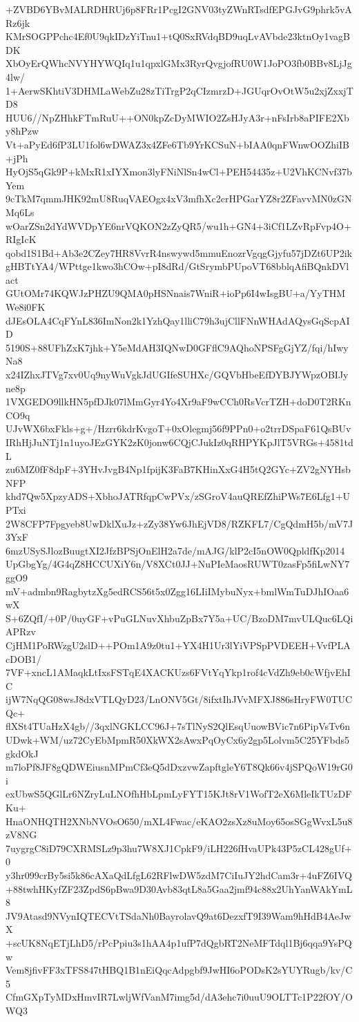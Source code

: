 +ZVBD6YBvMALRDHRUj6p8FRr1PcgI2GNV03tyZWnRTsdfEPGJvG9phrk5vARz6jk
KMrSOGPPchc4Ef0U9qkIDzYiTnu1+tQ0SxRVdqBD9uqLvAVbde23ktnOy1vagBDK
XbOyErQWhcNVYHYWQIq1u1qpxlGMx3RyrQvgjofRU0W1JoPO3fb0BBv8LjJg4lw/
1+AerwSKhtiV3DHMLaWebZu28zTiTrgP2qCIzmrzD+JGUqrOvOtW5u2xjZxxjTD8
HUU6//NpZHhkFTmRuU++ON0kpZcDyMWIO2ZsHJyA3r+nFsIrb8aPIFE2Xby8hPzw
Vt+aPyEd6fP3LU1fol6wDWAZ3x4ZFe6Tb9YrKCSuN+bIAA0qnFWnwOOZhiIB+jPh
HyOjS5qGk9P+kMxR1xIYXmon3lyFNiNlSn4wCl+PEH54435z+U2VhKCNvf37bYem
9cTkM7qmmJHK92mU8RuqVAEOgx4xV3mfhXc2crHPGarYZ8r2ZFavvMN0zGNMq6Ls
wOarZSn2dYdWVDpYE6nrVQKON2zZyQR5/wu1h+GN4+3iCf1LZvRpFvp4O+RIgIcK
qobd1S1Bd+Ab3e2CZey7HR8VvrR4nswywd5mmuEnozrVgqgGjyfu57jDZt6UP2ik
gHBTtYA4/WPttge1kwo3hCOw+pI8dRd/GtSrymbPUpoVT68bblqAfiBQnkDVlact
GUtOMr74KQWJzPHZU9QMA0pHSNnais7WniR+ioPp6I4wIsgBU+a/YyTHMWe8i0FK
dJEsOLA4CqFYnL836ImNon2k1YzhQay1lliC79h3ujCllFNnWHAdAQysGqScpAID
5190S+88UFhZxK7jhk+Y5eMdAH3IQNwD0GFflC9AQhoNPSFgGjYZ/fqi/hIwyNa8
x24IZhxJTVg7xv0Uq9nyWuVgkJdUGIfeSUHXc/GQVbHbeEfDYBJYWpzOBIJyne8p
1VXGEDO9llkHN5pfDJk07lMmGyr4Yo4Xr9aF9wCCh0RsVcrTZH+doD0T2RKnCO9q
UJvWX6bxFkls+g+/Hzrr6kdrKvgoT+0xOlegmj56f9PPn0+o2trrDSpaF61QsBUv
IRhHjJuNTj1n1uyoJEzGYK2zK0jonw6CQjCJukIz0qRHPYKpJlT5VRGs+4581tdL
zu6MZ0fF8dpF+3YHvJvgB4Np1fpijK3FaB7KHinXxG4H5tQ2GYc+ZV2gNYHsbNFP
khd7Qw5XpzyADS+XbhoJATRfqpCwPVx/zSGroV4auQREfZhiPWs7E6Lfg1+UPTxi
2W8CFP7Fpgyeb8UwDklXuJz+zZy38Yw6JhEjVD8/RZKFL7/CgQdmH5b/mV7J3YxF
6mzUSySJlozBuugtXI2JfzBPSjOnElH2a7de/mAJG/klP2cI5nOW0QpldfKp2014
UpGbgYg/4G4qZ8HCCUXiY6n/V8XCt0JJ+NuPIeMaosRUWT0zasFp5fiLwNY7ggO9
mV+admbn9RagbytzXg5edRCS56t5x0Zgg16LIiIMybuNyx+bmlWmTuDJhIOaa6wX
S+6ZQfI/+0P/0uyGF+vPuGLNuvXhbuZpBx7Y5a+UC/BzoDM7mvULQuc6LQiAPRzv
CjHM1PoRWzgU2slD++POm1A9z0tu1+YX4H1Ur3lYiVPSpPVDEEH+VvfPLAcDOB1/
7VF+xncL1AMaqkLtIxsFSTqE4XACKUzs6FVtYqYkp1rof4cVdZh9eb0cWfjvEhIC
ijW7NqQG08wsJ8dxVTLQyD23/LnONV5Gt/8ifxtIhJVvMFXJ886sHryFW0TUCQc+
flXSt4TUaHzX4gb//3qxlNGKLCC96J+7sTlNyS2QlEsqUuowBVic7n6PipVsTv6n
UDwk+WM/uz72CyEbMpmR50XkWX2sAwxPqOyCx6y2gp5Lolvm5C25YFbds5gkdOkJ
m7loPf8JF8gQDWEiusnMPmCf3eQ5dDxzvwZapftgleY6T8Qk66v4jSPQoW19rG0i
exUbwS5QGlLr6NZryLuLNOfhHbLpmLyFYT15KJt8rV1WofT2eX6MleIkTUzDFKu+
HnaONHQTH2XNbNVOsO650/mXL4Fwac/eKAO2zsXz8uMoy65osSGgWvxL5u8zV8NG
7uygrgC8iD79CXRMSLz9p3hu7W8XJ1CpkF9/iLH226fHvaUPk43P5zCL428gUf+0
y3hr099crBy5si5k86cAXaQdLfgL62RFlwDW5zdM7CiIuJY2hdCam3r+4uFZ6IVQ
+88twhHKyfZF23ZpdS6pBwa9D30Avb83qtL8a5Gaa2jmf94c88x2UhYanWAkYmL8
JV9Atasd9NVynIQTECVtTSdaNh0BayrolavQ9at6DezxfT9I39Wam9hHdB4AeJwX
+scUK8NqETjLhD5/rPcPpiu3s1hAA4p1ufP7dQgbRT2NeMFTdql1Bj6qqa9YsPQw
Vem8jfivFF3xTFS847tHBQ1B1nEiQqcAdpgbf9JwHI6oPODsK2sYUYRugb/kv/C5
CfmGXpTyMDxHmvIR7LwljWfVanM7img5d/dA3ehc7i0uuU9OLTTc1P22fOY/OWQ3
